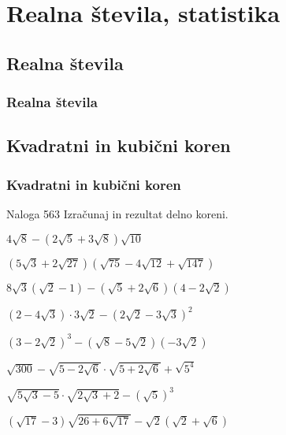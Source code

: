 \section{Realna števila, statistika}

\begin{frame}
    \sectionpage
\end{frame}

\begin{frame}
\end{frame}

    \subsection{Realna števila}

        \begin{frame}
            \frametitle{Realna števila}
        \end{frame}

    \subsection{Kvadratni in kubični koren}

        \begin{frame}
            \frametitle{Kvadratni in kubični koren}
        \end{frame}

        \begin{frame}
            \begin{exampleblock}{Naloga 563}
                Izračunaj in rezultat delno koreni.
                \begin{description}
                    \item<2->[(b)] $\displaystyle 4\sqrt{8}-\left(2\sqrt{5}+3\sqrt{8}\right)\sqrt{10}$
                    \item<3->[(č)] $\displaystyle\left(5\sqrt{3}+2\sqrt{27}\right)\left(\sqrt{75}-4\sqrt{12}+\sqrt{147}\right)$
                    \item<4->[(g)] $\displaystyle 8\sqrt{3}\left(\sqrt{2}-1\right)-\left(\sqrt{5}+2\sqrt{6}\right)\left(4-2\sqrt{2}\right)$  
                    \item<5->[(j)] $\displaystyle\left(2-4\sqrt{3}\right)\cdot 3\sqrt{2}-\left(2\sqrt{2}-3\sqrt{3}\right)^2$
                    \item<6->[(l)] $\displaystyle\left(3-2\sqrt{2}\right)^3-\left(\sqrt{8}-5\sqrt{2}\right)\left(-3\sqrt{2}\right)$
                    \item<7->[(o)] $\displaystyle\sqrt{300}-\sqrt{5-2\sqrt{6}}\cdot\sqrt{5+2\sqrt{6}}+\sqrt{5^4}$
                    \item<8->[(r)] $\displaystyle\sqrt{5\sqrt{3}-5}\cdot\sqrt{2\sqrt{3}+2}-\left(\sqrt{5}\right)^3$  
                    \item<9->[(u)] $\displaystyle\left(\sqrt{17}-3\right)\sqrt{26+6\sqrt{17}}-\sqrt{2}\left(\sqrt{2}+\sqrt{6}\right)$
                \end{description}
            \end{exampleblock}
        \end{frame}

